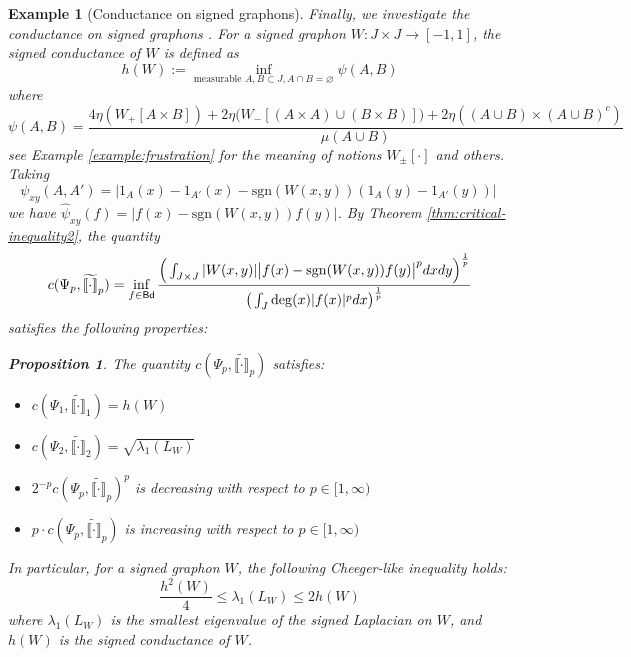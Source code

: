 \documentclass[12pt,a4paper]{article}
\newtheorem{prop}[theorem]{Proposition}
\newtheorem{example}[theorem]{Example}
\begin{document}
    
\begin{example}[Conductance on signed graphons]
    
Finally, we investigate the conductance on signed graphons \cite{Zhang/graphon}. 
For a signed graphon $W:J\times J\to [-1,1]$, the signed conductance of $W$ is defined as
$$h(W):=\inf_{\text{measurable }A,B\subset J,A\cap B=\varnothing} 
\psi(A,B)
$$
where 
$$\psi(A,B)=
\frac{4\eta(W_+[A\times B])+2\eta \big(W_-[(A\times A)\cup(B\times B)]\big)+2\eta((A\cup B)\times (A\cup B)^c)}{\mu(A\cup B)}$$
see Example \ref{example:frustration} for the meaning of notions $W_\pm[\cdot]$ and others. 
Taking 
$$\psi_{xy}(A,A')=
\big|1_A(x)-1_{A'}(x)-\mathrm{sgn}(W(x,y))(1_A(y)-1_{A'}(y))\big| \
$$
we have 
$\widehat{\psi}_{xy}(f)=\big|f(x)-\mathrm{sgn}(W(x,y))f(y)\big|$. By Theorem \ref{thm:critical-inequality2}, the quantity 
$$c(\Psi_p,\widetilde{\llbracket \cdot\rrbracket}_p)=\inf\limits_{f\in {\sf Bd}} \frac{\Big(\int_{J\times J}|W(x,y)|\big|f(x)-\mathrm{sgn}(W(x,y))f(y)\big|^pdxdy\Big)^{\frac1p} }{\big(\int_J \deg(x)|f(x)|^pdx\big)^{\frac1p}}$$
satisfies the following properties:
\begin{prop} The quantity $c(\Psi_p,\widetilde{\llbracket \cdot\rrbracket}_p)$ satisfies:

\begin{itemize}
\item $c(\Psi_1,\widetilde{\llbracket \cdot\rrbracket}_1)=h(W)$
\item $c(\Psi_2,\widetilde{\llbracket \cdot\rrbracket}_2)=\sqrt{\lambda_1(L_W)}$ 
\item $2^{-p}c(\Psi_p,\widetilde{\llbracket \cdot\rrbracket}_p)^p$ is decreasing with respect to $p\in[1,\infty)$
\item $p\cdot c(\Psi_p,\widetilde{\llbracket \cdot\rrbracket}_p)$ is increasing with respect to $p\in[1,\infty)$
\end{itemize} 
In particular, for a signed graphon $W$, the following Cheeger-like inequality holds:
$$ \frac{h^2(W)}{4} \le \lambda_1(L_W) \le 2h(W)$$
where $\lambda_1(L_W)$ is the smallest eigenvalue of the signed Laplacian on $W$, and $h(W)$ is the signed conductance of $W$.%
\end{prop}

\end{example}
\end{document}
